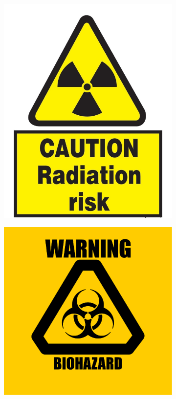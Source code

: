 \documentclass[a4paper,12pt,oneside,openright]{bhamthesis}
\begin{document}
\begin{figure}
		\centering
		\begin{subfigure}[b]{0.38\textwidth}
			\centering
			\includegraphics[width=\textwidth]{chapter5_fig/radiation.jpg}
		\end{subfigure}
		\hfill
		\begin{subfigure}[b]{0.41\textwidth}
			\centering
			\includegraphics[width=\textwidth]{chapter5_fig/biohazard.png}

\end{subfigure}
\end{figure}
\end{document}
